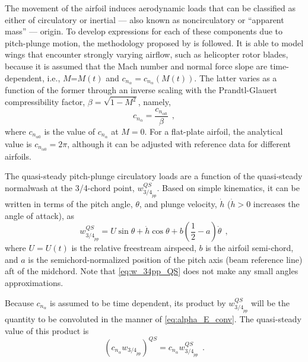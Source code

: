 \documentclass[12pt,a4paper,oneside,english]{abntex2} %
\newcommand{\fix}[1]{{\color{red}#1}}
\def\lp{\left(}
\def\rp{\right)}
\def\thetadot{\dot{\theta}}
\def\hdot{\dot{h}}
\begin{document}
The movement of the airfoil induces aerodynamic loads that can be classified as either of circulatory or inertial --- also known as noncirculatory or ``apparent mass'' --- origin. To develop expressions for each of these components due to pitch-plunge motion, the methodology proposed by  is followed. It is able to model wings that encounter strongly varying airflow, such as helicopter rotor blades, because it is assumed that the Mach number and normal force slope are time-dependent, i.e., $M$=$M(t)$ and $c_{n_{\alpha}}=c_{n_{\alpha}}(M(t))$. The latter varies as a function of the former through an inverse scaling with the Prandtl-Glauert compressibility factor, $\beta=\sqrt{1-M^2}$, namely,
\begin{equation}
    c_{n_{\alpha}} = \frac{c_{n_{\alpha0}}}{\beta} \ \ ,
    \label{eq:cnalpha}
\end{equation}
where $c_{n_{\alpha0}}$ is the value of $c_{n_{\alpha}}$ at $M=0$. For a flat-plate airfoil, the analytical value is $c_{n_{\alpha0}}=2\pi$, although it can be adjusted with reference data for different airfoils. 

The quasi-steady pitch-plunge circulatory loads are a function of the quasi-steady normalwash at the 3/4-chord point, $w_{{3/4}_{pp}}^{QS}$. Based on simple kinematics, it can be written in terms of the pitch angle, $\theta$, and plunge velocity, $\hdot$ \fix{($\hdot>0$ increases the angle of attack)}, as
\begin{equation}
    w_{{3/4}_{pp}}^{QS} = U\sin\theta + \hdot\cos\theta + b\lp\frac{1}{2}-a\rp\thetadot \ \ ,
    \label{eq:w_34pp_QS}
\end{equation}
where $U=U(t)$ is the relative freestream airspeed, $b$ is the airfoil semi-chord, and $a$ is the semichord-normalized position of the pitch axis (beam reference line) aft of the midchord. Note that \cref{eq:w_34pp_QS} does not make any small angles approximations. 

Because $c_{n_{\alpha}}$ is assumed to be time dependent, its product by $w_{{3/4}_{pp}}^{QS}$ will be the quantity to be convoluted in the manner of \cref{eq:alpha_E_conv}. The quasi-steady value of this product is
\begin{equation}
    \lp c_{n_{\alpha}}w_{{3/4}_{pp}}\rp^{QS} = c_{n_{\alpha}}w_{{3/4}_{pp}}^{QS} \ \ .
    \label{eq:cnaw_pp_QS}
\end{equation}
\end{document}
